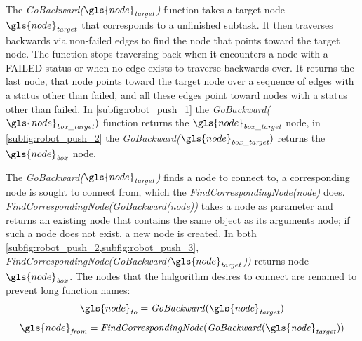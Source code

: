 The \textit{GoBackward($\gls{node}_\mathit{target}$)} function takes a target node $\gls{node}_\mathit{target}$ that corresponds to a unfinished subtask. It then traverses backwards via non-failed edges to find the node that points toward the target node. The function stops traversing back when it encounters a node with a FAILED status or when no edge exists to traverse backwards over. It returns the last node, that node points toward the target node over a sequence of edges with a status other than failed, and all these edges point toward nodes with a status other than failed. In \cref{subfig:robot_push_1} the \textit{GoBackward($\gls{node}_\mathit{box\_target})$} function returns the $\gls{node}_\mathit{box\_target}$ node, in \cref{subfig:robot_push_2} the \textit{GoBackward($\gls{node}_\mathit{box\_target})$} returns the $\gls{node}_\mathit{box}$ node.\bs

The \textit{GoBackward($\gls{node}_\mathit{target}$)} finds a node to connect to, a corresponding node is sought to connect from, which the \textit{FindCorrespondingNode(\gls{node})} does. \textit{FindCorrespondingNode(GoBackward(\gls{node}))} takes a node as parameter and returns an existing node that contains the same object as its arguments node; if such a node does not exist, a new node is created. In both \cref{subfig:robot_push_2,subfig:robot_push_3}, \textit{FindCorrespondingNode(GoBackward($\gls{node}_\mathit{target}$))} returns node $\gls{node}_\mathit{box}$. The nodes that the \ac{halgorithm} desires to connect are renamed to prevent long function names:
\[\gls{node}_\mathit{to} =  \mathit{GoBackward(\gls{node}_\mathit{target})}\]
\[\gls{node}_\mathit{from} = \mathit{FindCorrespondingNode(GoBackward(\gls{node}_\mathit{target}))}\]

